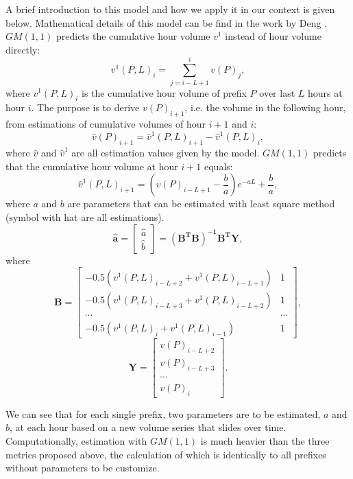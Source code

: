 A brief introduction to this model and how we apply it in our context is given below. Mathematical details of this model can be find in the work by Deng \cite{Julong1989}.
$GM(1,1)$ predicts the cumulative hour volume $v^1$ instead of hour volume directly:
\begin{equation*}
v^1(P,L)_{i} = \displaystyle \sum_{j=i-L+1}^{i} v(P)_j,
\end{equation*}
where $v^1(P,L)_{i}$ is the cumulative hour volume of prefix $P$ over last $L$ hours at hour $i$. The purpose is to derive $v(P)_{i+1}$, i.e. the volume in the following hour, from estimations of cumulative volumes of hour $i+1$ and $i$:
\begin{equation*}
\hat{v}(P)_{i+1} = \hat{v}^1(P,L)_{i+1} - \hat{v}^1(P,L)_{i},
\end{equation*}
where $\hat v$ and $\hat v ^1$ are all estimation values given by the model.
$GM(1,1)$ predicts that the cumulative hour volume at hour $i+1$ equals:
\begin{equation*}
\hat v ^1 (P,L)_{i+1} = (v(P)_{i-L+1} - \frac{b}{a}) e^{-aL} + \frac{b}{a},
\end{equation*}
where $a$ and $b$ are parameters that can be estimated with least square method (symbol with hat are all estimations).
\begin{equation*}
\mathbf{\hat a} = \begin{bmatrix}
\hat a \\ \hat b
\end{bmatrix} = \mathbf{(B^TB)^{-1}B^T Y},
\end{equation*}
where
\begin{equation*}
\mathbf{B} = \begin{bmatrix}
-0.5(v^1(P,L)_{i-L+2} + v^1(P,L)_{i-L+1}) & 1\\
-0.5(v^1(P,L)_{i-L+3} + v^1(P,L)_{i-L+2}) & 1\\
\cdots & \cdots \\
-0.5(v^1(P,L)_i + v^1(P,L)_{i-1}) & 1
\end{bmatrix},
\end{equation*}
\begin{equation*}
\mathbf{Y} = \begin{bmatrix}
v(P)_{i-L+2}\\
v(P)_{i-L+3}\\
\cdots\\
v(P)_i
\end{bmatrix}.
\end{equation*}

We can see that for each single prefix, two parameters are to be estimated, $a$ and $b$, at each hour based on a new volume series that slides over time. Computationally, estimation with $GM(1,1)$ is much heavier than the three metrics proposed above, the calculation of which is identically to all prefixes without parameters to be customize.

